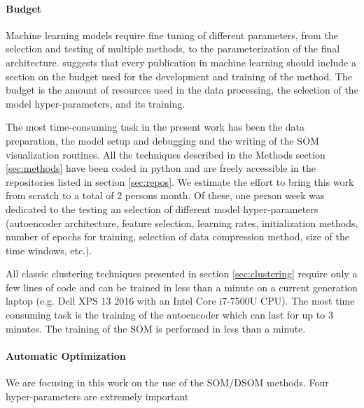 \paragraph{Budget}
Machine learning models require fine tuning of different parameters, from the selection and testing of multiple methods, to the parameterization of the final architecture. \citep{[REF??]} suggests that every publication in machine learning should include a section on the budget used for the development and training of the method. The budget is the amount of resources used in the data processing, the selection of the model hyper-parameters, and its training.

The most time-consuming task in the present work has been the data preparation, the model setup and debugging and the writing of the SOM visualization routines. All the techniques described in the Methods section \ref{sec:methods} have been coded in python and are freely accessible in the repositories listed in section \ref{sec:repos}. We estimate the effort to bring this work from scratch to a total of 2 persons month. Of these, one person week was dedicated to the testing an selection of different model hyper-parameters (autoencoder architecture, feature selection, learning rates, initialization methods, number of epochs for training, selection of data compression method, size of the time windows, etc.).

All classic clustering techniques presented in section \ref{sec:clustering} require only a few lines of code and can be trained in less than a minute on a current generation laptop (e.g. Dell XPS 13 2016 with an Intel Core i7-7500U CPU). The most time consuming task is the training of the autoencoder which can last for up to 3 minutes. The training of the SOM is performed in less than a minute.

\paragraph{Automatic Optimization}
We are focusing in this work on the use of the SOM/DSOM methods. Four hyper-parameters are extremely important 